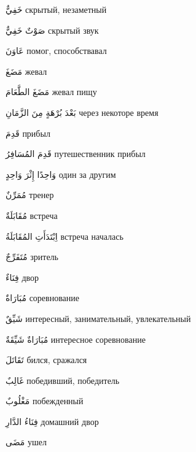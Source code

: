 \documentclass[a5paper]{article}
\newcommand\textstyleDropCaps[1]{#1}
\newcommand\textstyleCaptioncharacters[1]{#1}
\begin{document}
\textstyleCaptioncharacters{خَفِيٌّ }\textstyleDropCaps{скрытый, незамет­ный‎}

\textstyleCaptioncharacters{صَوْتٌ خَفِيٌّ }\textstyleDropCaps{скрытый звук‎}

\textstyleCaptioncharacters{عَاوَنَ }\textstyleDropCaps{помог, способства­вал‎}

\textstyleCaptioncharacters{مَضَغَ }\textstyleDropCaps{жевал‎}

\textstyleCaptioncharacters{مَضَغَ الطَّعَامَ }\textstyleDropCaps{жевал пищу‎}

\textstyleCaptioncharacters{بَعْدَ بُرْهَةٍ مِنَ الزَّمَانِ }\textstyleDropCaps{через некоторе время ‎}

\textstyleCaptioncharacters{قَدِمَ }\textstyleDropCaps{прибыл‎}

\textstyleCaptioncharacters{قَدِمَ المُسَافِرُ }\textstyleDropCaps{путеше­ственник прибыл‎}

\textstyleCaptioncharacters{وَاحِدًا إِثْرَ وَاحِدٍ }\textstyleDropCaps{один за другим ‎}

\textstyleCaptioncharacters{مُمَرِّنٌ }\textstyleDropCaps{тренер‎}

\textstyleCaptioncharacters{مُقَابَلَةٌ }\textstyleDropCaps{встреча‎}

\textstyleCaptioncharacters{اِبْتَدَأَتِ المُقَابَلَةُ }\textstyleDropCaps{встре­ча началась‎}

\textstyleCaptioncharacters{مُتَفَرِّجٌ }\textstyleDropCaps{зритель‎}

\textstyleCaptioncharacters{فِنَاءٌ }\textstyleDropCaps{двор‎}

\textstyleCaptioncharacters{مُبَارَاةٌ }\textstyleDropCaps{соревнование‎}

\textstyleCaptioncharacters{شَيِّقٌ }\textstyleDropCaps{интересный, занимат­ельный, увлекательный‎}

\textstyleCaptioncharacters{مُبَارَاةٌ شَيِّقَةٌ }\textstyleDropCaps{интерес­ное соревнование‎}

\textstyleCaptioncharacters{تَقَاتَلَ }\textstyleDropCaps{бился, сражался‎}

\textstyleCaptioncharacters{غَالِبٌ }\textstyleDropCaps{победивший, побе­дитель‎}

\textstyleCaptioncharacters{مَغْلُوبٌ }\textstyleDropCaps{побежденный‎}

\textstyleCaptioncharacters{فِنَاءُ الدَّارِ }\textstyleDropCaps{домашний двор‎}

\textstyleCaptioncharacters{مَضَى }\textstyleDropCaps{ушел‎}
\end{document}
